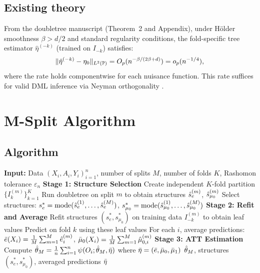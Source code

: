 \documentclass[12pt]{article}
\begin{document}
\subsection{Existing theory}

From the doubletree manuscript (Theorem~2 and Appendix), under H\"older smoothness $\beta > d/2$ and standard regularity conditions, the fold-specific tree estimator $\hat\eta^{(-k)}$ (trained on $I_{-k}$) satisfies:
\begin{equation}\label{eq:existing-rate}
\|\hat\eta^{(-k)} - \eta_0\|_{L^2(\mathbb{P})} = O_p(n^{-\beta/(2\beta+d)}) = o_p(n^{-1/4}),
\end{equation}
where the rate holds componentwise for each nuisance function. This rate suffices for valid DML inference via Neyman orthogonality \citep{chernozhukov2018}.

\section{M-Split Algorithm}

\subsection{Algorithm}

\begin{algorithm}[H]
\caption{M-Split Doubletree}
\label{alg:msplit}
\begin{algorithmic}[1]
\STATE \textbf{Input:} Data $(X_i, A_i, Y_i)_{i=1}^n$, number of splits $M$, number of folds $K$, Rashomon tolerance $\varepsilon_n$
\STATE \textbf{Stage 1: Structure Selection}
\STATE Create independent $K$-fold partition $\{I_k^{(m)}\}_{k=1}^K$
\STATE Run doubletree on split $m$ to obtain structures $\hat{s}_e^{(m)}$, $\hat{s}_{\mu_0}^{(m)}$
\ENDFOR
\STATE Select structures: $s_e^* = \text{mode}(\hat{s}_e^{(1)}, \ldots, \hat{s}_e^{(M)})$, $s_{\mu_0}^* = \text{mode}(\hat{s}_{\mu_0}^{(1)}, \ldots, \hat{s}_{\mu_0}^{(M)})$
\STATE \textbf{Stage 2: Refit and Average}
\STATE Refit structures $(s_e^*, s_{\mu_0}^*)$ on training data $I_{-k}^{(m)}$ to obtain leaf values
\STATE Predict on fold $k$ using these leaf values
\ENDFOR
\ENDFOR
\STATE For each $i$, average predictions: $\bar{e}(X_i) = \frac{1}{M} \sum_{m=1}^M \hat{e}_i^{(m)}$, $\bar{\mu}_0(X_i) = \frac{1}{M} \sum_{m=1}^M \hat{\mu}_{0,i}^{(m)}$
\STATE \textbf{Stage 3: ATT Estimation}
\STATE Compute $\hat{\theta}_M = \frac{1}{n} \sum_{i=1}^n \psi(O_i; \hat{\theta}_M, \bar{\eta})$ where $\bar{\eta} = (\bar{e}, \bar{\mu}_0, \bar{\mu}_1)$
\RETURN $\hat{\theta}_M$, structures $(s_e^*, s_{\mu_0}^*)$, averaged predictions $\bar{\eta}$
\end{algorithmic}
\end{algorithm}
\end{document}
